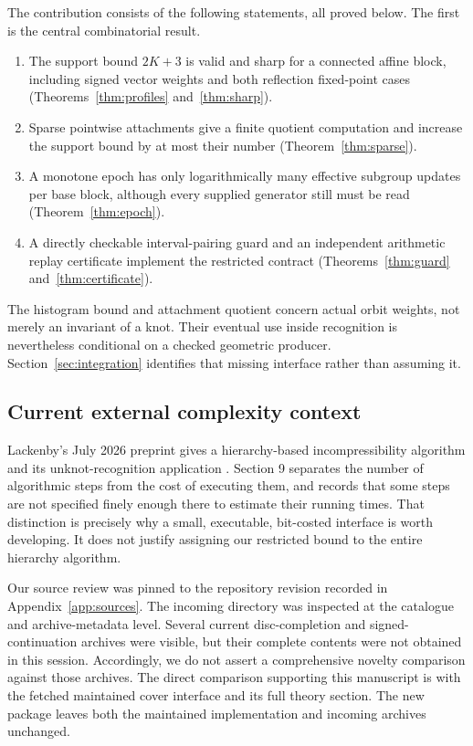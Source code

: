 \documentclass[11pt]{article}
\theoremstyle{definition}
\begin{document}
The contribution consists of the following statements, all proved below. The first is the central combinatorial result.
\begin{enumerate}[leftmargin=*,itemsep=3pt]
\item The support bound $2K+3$ is valid and sharp for a connected affine block, including signed vector weights and both reflection fixed-point cases (Theorems~\ref{thm:profiles} and~\ref{thm:sharp}).
\item Sparse pointwise attachments give a finite quotient computation and increase the support bound by at most their number (Theorem~\ref{thm:sparse}).
\item A monotone epoch has only logarithmically many effective subgroup updates per base block, although every supplied generator still must be read (Theorem~\ref{thm:epoch}).
\item A directly checkable interval-pairing guard and an independent arithmetic replay certificate implement the restricted contract (Theorems~\ref{thm:guard} and~\ref{thm:certificate}).
\end{enumerate}

The histogram bound and attachment quotient concern actual orbit weights, not merely an invariant of a knot. Their eventual use inside recognition is nevertheless conditional on a checked geometric producer. Section~\ref{sec:integration} identifies that missing interface rather than assuming it.

\subsection{Current external complexity context}
Lackenby's July 2026 preprint gives a hierarchy-based incompressibility algorithm and its unknot-recognition application \cite{lackenby}. Section 9 separates the number of algorithmic steps from the cost of executing them, and records that some steps are not specified finely enough there to estimate their running times. That distinction is precisely why a small, executable, bit-costed interface is worth developing. It does not justify assigning our restricted bound to the entire hierarchy algorithm.

Our source review was pinned to the repository revision recorded in Appendix~\ref{app:sources}. The incoming directory was inspected at the catalogue and archive-metadata level. Several current disc-completion and signed-continuation archives were visible, but their complete contents were not obtained in this session. Accordingly, we do not assert a comprehensive novelty comparison against those archives. The direct comparison supporting this manuscript is with the fetched maintained cover interface and its full theory section. The new package leaves both the maintained implementation and incoming archives unchanged.
\end{document}
